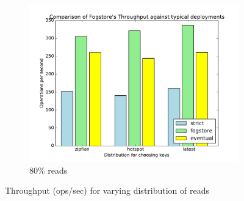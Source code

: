 \begin{figure}[t]
\begin{subfigure}[b]{0.32\linewidth}
    \includegraphics[width=\linewidth]{figures/fogstore/evals/stress-tests/0.8/tmp.pdf}
    \caption{80\% reads}
  \end{subfigure}
  \caption{Throughput (ops/sec) for varying distribution of reads}
  \label{fig:tputs}
\end{figure}

